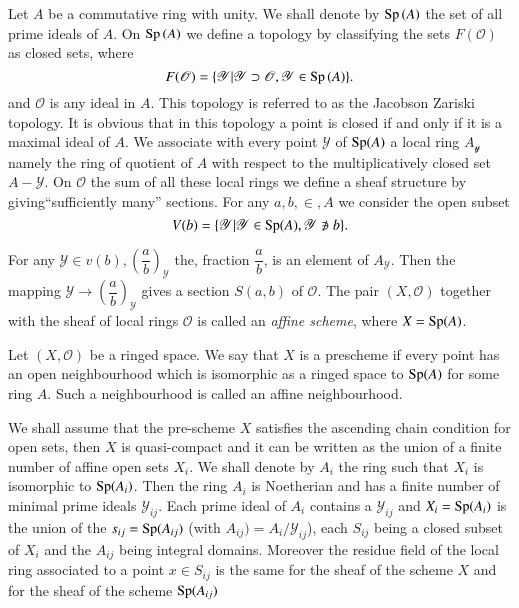Let $A$ be a commutative ring with unity. We shall denote by
$\operatorname{Sp} \,(A)$ the set of all prime ideals of $A$. On $\operatorname{Sp} \,(A)$ we define a
topology by classifying the sets $F(\mathscr{O})$ as closed sets,
where 
$$
F(\mathscr{O})=\{ \mathscr{Y} | \mathscr{Y} \supset \mathscr{O},
\mathscr{Y} \in \operatorname{Sp} \,(A) \}. 
$$
and $\mathscr{O}$ is any ideal in $A$. This topology is referred to as
the Jacobson Zariski topology. It is obvious that in this topology a
point is closed if and only if it is a maximal ideal of $A$. We
associate with every point $\mathscr{Y}$ of $\operatorname{Sp} (A)$ a local ring
$A_{\mathscr{y}}$ namely
the ring of quotient of $A$ with respect to the multiplicatively
closed set $A-\mathscr{Y}$. On $\mathscr{O}$ the sum of all these\pageoriginale
local rings we define a sheaf structure by giving``sufficiently many''
sections. For any $a, b, \in, A$ we consider the open subset 
$$
V(b)=\{\mathscr{Y}|\mathscr{Y} \in \Sp (A), \mathscr{Y} \notni b \}.
$$

For any $\mathscr{Y} \in v(b), \left(\dfrac{a}{b}\right)_{\mathscr{Y}}$ the,
fraction $\dfrac{a}{b}$, is an element of $A_\mathscr{Y}$. Then the
mapping $\mathscr{Y} \to \left(\dfrac{a}{b}\right)_{\mathscr{Y}}$ gives a section
$S(a, b)$ of $\mathscr{O}$. The pair $(X, \mathscr{O})$ together with
the sheaf of local rings $\mathscr{O}$ is called an \textit{affine
  scheme}, where $X=\operatorname{Sp} (A)$.  

\begin{defi*}
  Let $(X, \mathscr{O})$ be a ringed space. We say that $X$ is a
  prescheme if every point has an open neighbourhood which is
  isomorphic as a ringed space to $\operatorname{Sp} (A)$ for some ring $A$. Such a
  neighbourhood is called an affine neighbourhood. 
\end{defi*}

We shall assume that the pre-scheme $X$ satisfies the ascending chain
condition for open sets, then $X$ is quasi-compact and it can be
written as the union of a finite number of affine open sets $X_i$. We
shall denote by $A_i$ the ring such that $X_i$ is isomorphic to
$\operatorname{Sp} (A_i)$. Then the ring $A_i$ is Noetherian and has a finite number
of minimal prime ideals $\mathscr{Y}_{ij}$. Each prime ideal of $A_i$
contains a $\mathscr{Y}_{ij}$ and $X_i=\operatorname{Sp} (A_i)$ is the union of the
$s_{ij}=\operatorname{Sp} (A_{ij})$ (with $A_{ij})=A_i/\mathscr{Y}_{ij}$), each
$S_{ij}$ being a closed subset of $X_i$ and the $A_{ij}$ being
integral domains. Moreover the residue field of the local ring
associated to a point $x \in S_{ij}$ is the same for the sheaf of the
scheme $X$ and for the sheaf of the scheme $\operatorname{Sp} (A_{ij})$ 

